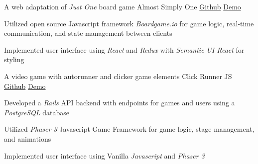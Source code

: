 \vspace{-1.0mm}

\begin{cventries}

  \cventry
    {A web adaptation of \textit{Just One} board game} %
    {Almost Simply One\vspace{-2.0mm}} %
    {\href{https://github.com/jhcheung/almost-simply-one}{Github}\vspace{-2.0mm}} %
    {\href{https://almost-simply-one.herokuapp.com/}{Demo}} %
    {
      \begin{cvitems} %
		\item {Utilized open source Javascript framework \textit{Boardgame.io} for game logic, real-time communication, and state management between clients}
        \item {Implemented user interface using \textit{React} and \textit{Redux} with \textit{Semantic UI React} for styling}      
    \end{cvitems}
    }

  \cventry
    {A video game with autorunner and clicker game elements} %
    {Click Runner JS\vspace{-2.0mm}} %
    {\href{https://github.com/jhcheung/click-runner-js}{Github}\vspace{-2.0mm}} %
    {\href{https://click-runner-js.herokuapp.com/}{Demo}} %
    {
    \begin{cvitems} %
      \item {Developed a \textit{Rails} API backend with endpoints for games and users using a \textit{PostgreSQL} database} 
		  \item {Utilized \textit{Phaser 3} Javascript Game Framework for game logic, stage management, and animations}
		  \item {Implemented user interface using Vanilla \textit{Javascript} and \textit{Phaser 3}}      
    \end{cvitems}
  }


\end{cventries}
